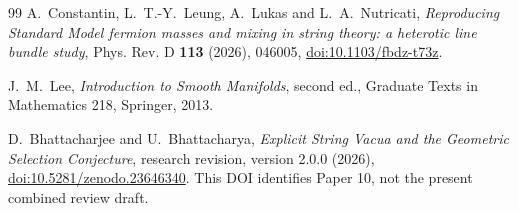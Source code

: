 \begin{thebibliography}{99}
A.~Constantin, L.~T.-Y.~Leung, A.~Lukas and L.~A.~Nutricati,
\emph{Reproducing Standard Model fermion masses and mixing in string theory:
a heterotic line bundle study}, Phys. Rev. D \textbf{113} (2026), 046005,
\href{https://doi.org/10.1103/fbdz-t73z}{doi:10.1103/fbdz-t73z}.

J.~M.~Lee, \emph{Introduction to Smooth Manifolds},
second ed., Graduate Texts in Mathematics 218, Springer, 2013.

D.~Bhattacharjee and U.~Bhattacharya,
\emph{Explicit String Vacua and the Geometric Selection Conjecture},
research revision, version 2.0.0 (2026),
\href{https://doi.org/10.5281/zenodo.23646340}{doi:10.5281/zenodo.23646340}.
This DOI identifies Paper 10, not the present combined review draft.
\end{thebibliography}
